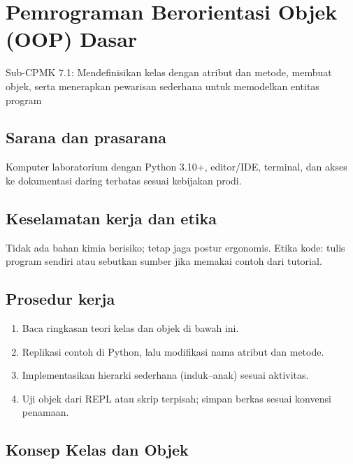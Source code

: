 \documentclass[../main.tex]{subfiles}
\begin{document}
\chapter{Pemrograman Berorientasi Objek (OOP) Dasar}

\begin{subcpmk}
  \item Sub-CPMK 7.1: Mendefinisikan kelas dengan atribut dan metode, membuat objek, serta menerapkan pewarisan sederhana untuk memodelkan entitas program
\end{subcpmk}


\section{Sarana dan prasarana}

Komputer laboratorium dengan Python 3.10+, editor/IDE, terminal, dan akses ke dokumentasi daring terbatas sesuai kebijakan prodi.

\section{Keselamatan kerja dan etika}

Tidak ada bahan kimia berisiko; tetap jaga postur ergonomis. Etika kode: tulis program sendiri atau sebutkan sumber jika memakai contoh dari tutorial.

\section{Prosedur kerja}

\begin{enumerate}[leftmargin=*]
  \item Baca ringkasan teori kelas dan objek di bawah ini.
  \item Replikasi contoh di Python, lalu modifikasi nama atribut dan metode.
  \item Implementasikan hierarki sederhana (induk--anak) sesuai aktivitas.
  \item Uji objek dari REPL atau skrip terpisah; simpan berkas sesuai konvensi penamaan.
\end{enumerate}

\section{Konsep Kelas dan Objek}
\end{document}
